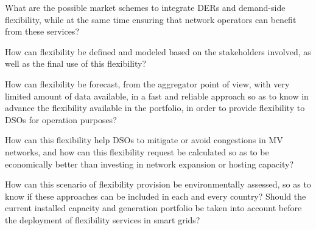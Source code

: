 \begin{tcolorbox}
\begin{RQ}
\item What are the possible market schemes to integrate DERs and demand-side flexibility, while at the same time ensuring that network operators can benefit from these services?  
\item How can flexibility be defined and modeled based on the stakeholders involved, as well as the final use of this flexibility?
\item How can flexibility be forecast, from the aggregator point of view, with very limited amount of data available, in a fast and reliable approach so as to know in advance the flexibility available in the portfolio, in order to provide flexibility to DSOs for operation purposes?
\item How can this flexibility help DSOs to mitigate or avoid congestions in MV networks, and how can this flexibility request be calculated so as to be economically better than investing in network expansion or hosting capacity?
\item How can this scenario of flexibility provision be environmentally assessed, so as to know if these approaches can be included in each and every country? Should the current installed capacity and generation portfolio be taken into account before the deployment of flexibility services in smart grids?
\end{RQ}
\end{tcolorbox}
\vspace*{2mm}


